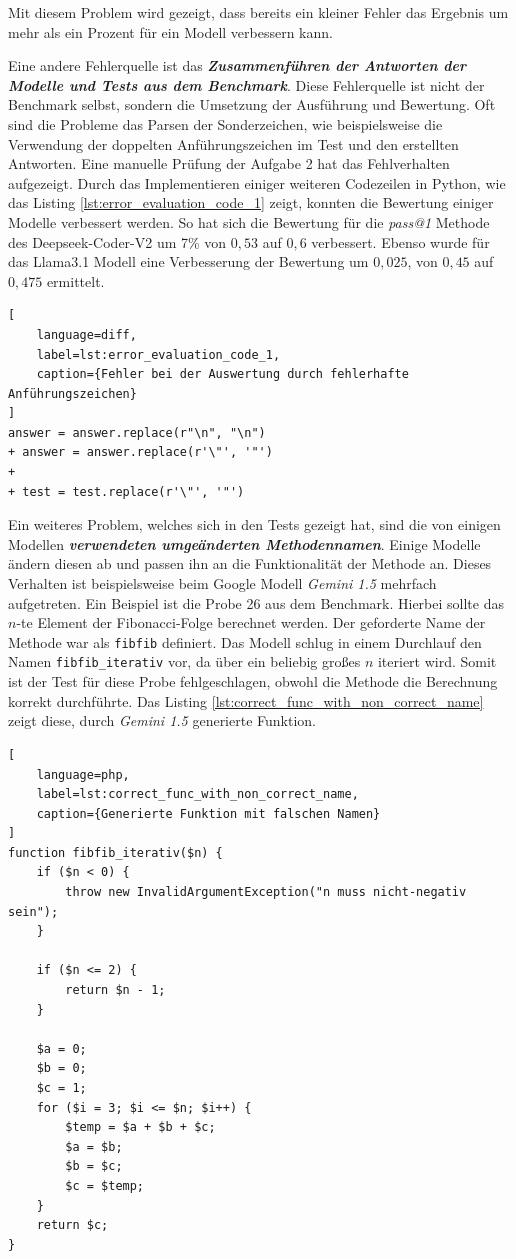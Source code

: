 Mit diesem Problem wird gezeigt, dass bereits ein kleiner Fehler das Ergebnis um mehr als ein Prozent für ein Modell verbessern kann.\vspace{0.2cm}

Eine andere Fehlerquelle ist das \textit{\textbf{Zusammenführen der Antworten der Modelle und Tests aus dem Benchmark}}. Diese Fehlerquelle ist nicht der Benchmark selbst, sondern die Umsetzung der Ausführung und Bewertung. Oft sind die Probleme das Parsen der Sonderzeichen, wie beispielsweise die Verwendung der doppelten Anführungszeichen im Test und den erstellten Antworten. Eine manuelle Prüfung der Aufgabe 2 hat das Fehlverhalten aufgezeigt. Durch das Implementieren einiger weiteren Codezeilen in Python, wie das Listing \ref{lst:error_evaluation_code_1} zeigt, konnten die Bewertung einiger Modelle verbessert werden. So hat sich die Bewertung für die \textit{pass@1} Methode des Deepseek-Coder-V2 um 7\% von $0,53$ auf $0,6$ verbessert. Ebenso wurde für das Llama3.1 Modell eine Verbesserung der Bewertung um $0,025$, von $0,45$ auf $0,475$ ermittelt.\vspace{0.2cm}

\begin{lstlisting}[
	language=diff,
	label=lst:error_evaluation_code_1,
	caption={Fehler bei der Auswertung durch fehlerhafte Anführungszeichen}
]
answer = answer.replace(r"\n", "\n")
+ answer = answer.replace(r'\"', '"')
+ 
+ test = test.replace(r'\"', '"') 
\end{lstlisting}

Ein weiteres Problem, welches sich in den Tests gezeigt hat, sind die von einigen Modellen \textit{\textbf{verwendeten umgeänderten Methodennamen}}. Einige Modelle ändern diesen ab und passen ihn an die Funktionalität der Methode an. Dieses Verhalten ist beispielsweise beim Google Modell \textit{Gemini 1.5} mehrfach aufgetreten. Ein Beispiel ist die Probe 26 aus dem Benchmark. Hierbei sollte das $n$-te Element der Fibonacci-Folge berechnet werden. Der geforderte Name der Methode war als \texttt{fibfib} definiert. Das Modell schlug in einem Durchlauf den Namen \texttt{fibfib\_iterativ} vor, da über ein beliebig großes $n$ iteriert wird. Somit ist der Test für diese Probe fehlgeschlagen, obwohl die Methode die Berechnung korrekt durchführte. Das Listing \ref{lst:correct_func_with_non_correct_name} zeigt diese, durch \textit{Gemini 1.5} generierte Funktion.\vspace{0.2cm}

\begin{lstlisting}[
	language=php,
	label=lst:correct_func_with_non_correct_name,
	caption={Generierte Funktion mit falschen Namen}
]
function fibfib_iterativ($n) {
    if ($n < 0) {
        throw new InvalidArgumentException("n muss nicht-negativ sein");
    }

    if ($n <= 2) {
        return $n - 1;
    }

    $a = 0;
    $b = 0;
    $c = 1;
    for ($i = 3; $i <= $n; $i++) {
        $temp = $a + $b + $c;
        $a = $b;
        $b = $c;
        $c = $temp;
    }
    return $c;
}
\end{lstlisting}


